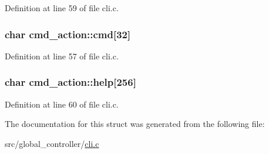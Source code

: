 Definition at line 59 of file cli.\-c.

\hypertarget{structcmd__action_a35a18d029cdcc1a21d74f5a6eadd95a9}{
\subsubsection[{cmd}]{\setlength{\rightskip}{0pt plus 5cm}char cmd\-\_\-action\-::cmd\mbox{[}32\mbox{]}}}\label{structcmd__action_a35a18d029cdcc1a21d74f5a6eadd95a9}


Definition at line 57 of file cli.\-c.

\hypertarget{structcmd__action_a426f4bdd272623577e9a5e8cafa85656}{
\subsubsection[{help}]{\setlength{\rightskip}{0pt plus 5cm}char cmd\-\_\-action\-::help\mbox{[}256\mbox{]}}}\label{structcmd__action_a426f4bdd272623577e9a5e8cafa85656}


Definition at line 60 of file cli.\-c.



The documentation for this struct was generated from the following file\-:\begin{DoxyCompactItemize}
\item 
src/global\-\_\-controller/\hyperlink{cli_8c}{cli.\-c}\end{DoxyCompactItemize}

